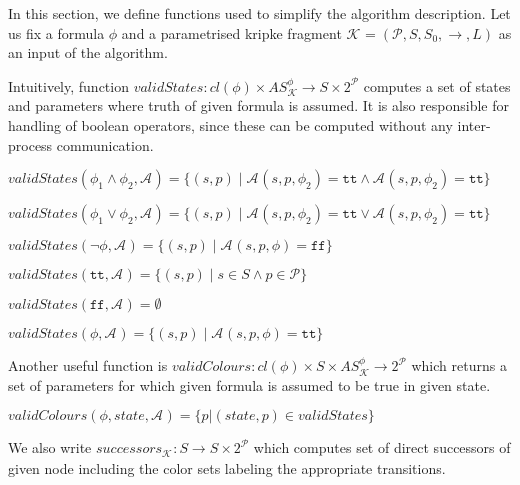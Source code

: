 \documentclass[12pt,oneside,draft]{fithesis2}
\newcommand{\as}[1][]{\ensuremath{\mathcal{A}_{#1}}}
\newcommand{\ASphi}{\ensuremath{AS_{\mathcal K}^\phi}}
\newcommand{\true}{\ensuremath{\texttt{tt}}}
\newcommand{\false}{\ensuremath{\texttt{ff}}}
\newcommand{\ks}[1][]{\ensuremath{\mathcal{K}_{#1}}}
\newcommand{\fullKs}{\ensuremath{ \ks = (\params, S, S_0, \trans{}, L) }}
\newcommand{\trans}[1]{\stackrel{#1}{\rightarrow}}
\newcommand{\params}{\mathcal{P}}
\begin{document}
    		In this section, we define functions used to simplify the algorithm description. Let us fix a formula $\phi$ and a parametrised kripke fragment $\fullKs$ as an input of the algorithm.
			
			Intuitively, function $validStates : cl(\phi) \times \ASphi \rightarrow S \times 2^\mathcal{P} $ computes a set of states and parameters where truth of given formula is assumed. It is also responsible for handling of boolean operators, since these can be computed without any inter-process communication. 
			
			\begin{center}
				$validStates(\phi_1 \wedge \phi_2, \as) = \{ (s, p) \mid \as(s, p, \phi_2) = \true \wedge \as(s, p, \phi_2) = \true \} $
			\end{center}
			
			\begin{center}
				$validStates(\phi_1 \vee \phi_2, \as) = \{ (s, p) \mid \as(s, p, \phi_2) = \true \vee \as(s, p, \phi_2) = \true \} $
			\end{center}
			
			\begin{center}
				$validStates(\neg\phi, \as) = \{ (s, p) \mid \as(s, p, \phi) = \false \} $
			\end{center}
			
			\begin{center}
				$validStates(\true, \as) = \{ (s, p) \mid s \in S \wedge p \in \params \} $
			\end{center}

			\begin{center}
				$validStates(\false, \as) = \emptyset $
			\end{center}
						
			\begin{center}
				$validStates(\phi, \as) = \{ (s, p) \mid \as(s, p, \phi) = \true \} $
			\end{center}

			Another useful function is $validColours : cl(\phi) \times S \times \ASphi \rightarrow 2^\mathcal{P}	$ which returns a set of parameters for which given formula is assumed to be true in given state. 
			
			\begin{center}
				$validColours(\phi, state, \as) = \{ p | (state, p) \in validStates \}$
			\end{center}
			
			We also write $successors_{\ks} : S \rightarrow S \times 2^\mathcal{P} $ which computes set of direct successors of given node including the color sets labeling the appropriate transitions.
\end{document}
